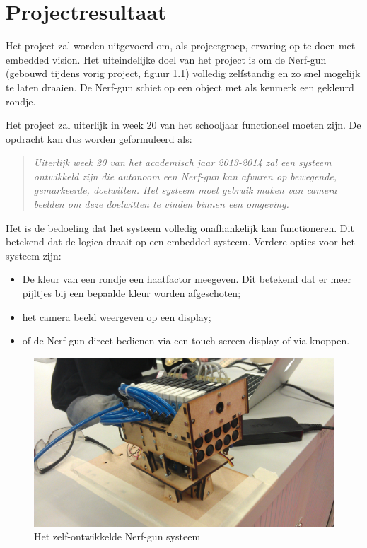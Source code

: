 \chapter{Projectresultaat}

Het project zal worden uitgevoerd om, als projectgroep, ervaring op te doen met
embedded vision. Het uiteindelijke doel van het project is om de Nerf-gun
(gebouwd tijdens vorig project, figuur \ref{fig:nerf}) volledig zelfstandig en
zo snel mogelijk te laten draaien. De Nerf-gun schiet op een object met als
kenmerk een gekleurd rondje.

Het project zal uiterlijk in week 20 van het schooljaar functioneel moeten
zijn. De opdracht kan dus worden geformuleerd als:

\begin{quotation}
\emph{Uiterlijk week 20 van het academisch jaar 2013-2014 zal een systeem
ontwikkeld zijn die autonoom een Nerf-gun kan afvuren op bewegende, gemarkeerde,
doelwitten. Het systeem moet gebruik maken van camera beelden om deze doelwitten
te vinden binnen een omgeving.}
\end{quotation}

Het is de bedoeling dat het systeem volledig onafhankelijk kan functioneren.
Dit betekend dat de logica draait op een embedded systeem. Verdere opties voor
het systeem zijn:

\begin{itemize}
    \item De kleur van een rondje een haatfactor meegeven. Dit betekend dat er
        meer pijltjes bij een bepaalde kleur worden afgeschoten;
    \item het camera beeld weergeven op een display;
    \item of de Nerf-gun direct bedienen via een touch screen display of via
        knoppen.
\end{itemize}

\begin{figure}
    \begin{center}
        \includegraphics[scale=0.1]{figures/autonerf.jpg}
    \end{center}
    \caption{Het zelf-ontwikkelde Nerf-gun systeem}
    \label{fig:nerf}
\end{figure}
